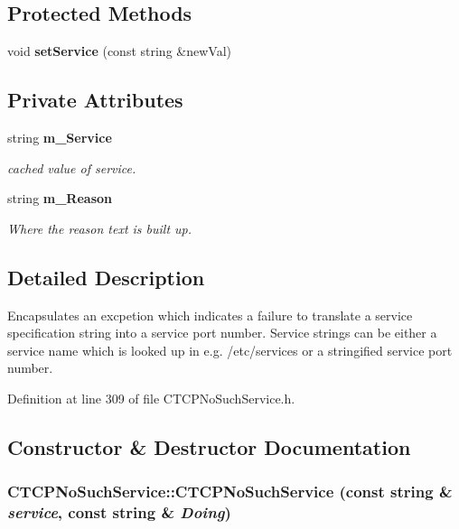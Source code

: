 \subsection*{Protected Methods}
\begin{CompactItemize}
\item 
void {\bf set\-Service} (const string \&new\-Val)
\end{CompactItemize}
\subsection*{Private Attributes}
\begin{CompactItemize}
\item 
string {\bf m\_\-Service}
\begin{CompactList}\small\item\em cached value of service.\item\end{CompactList}\item 
string {\bf m\_\-Reason}
\begin{CompactList}\small\item\em Where the reason text is built up.\item\end{CompactList}\end{CompactItemize}


\subsection{Detailed Description}
Encapsulates an excpetion which indicates a failure to translate a service specification string into a service port number. Service strings can be either a service name which is looked up in e.g. /etc/services or a  stringified service port number. 



Definition at line 309 of file CTCPNo\-Such\-Service.h.

\subsection{Constructor \& Destructor Documentation}
\subsubsection{\setlength{\rightskip}{0pt plus 5cm}CTCPNo\-Such\-Service::CTCPNo\-Such\-Service (const string \& {\em service}, const string \& {\em Doing})}\label{classCTCPNoSuchService_a0}


